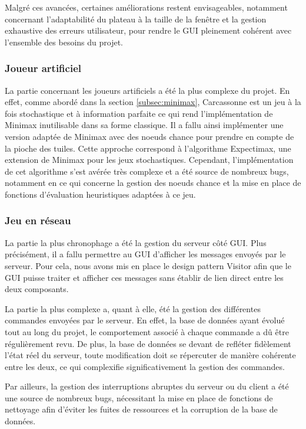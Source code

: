 \documentclass[11pt]{article}
\begin{document}
Malgré ces avancées, certaines améliorations restent envisageables, 
notamment concernant l'adaptabilité du plateau à la taille de la fenêtre 
et la gestion exhaustive des erreurs utilisateur, pour rendre le GUI 
pleinement cohérent avec l'ensemble des besoins du projet.

\subsubsection{Joueur artificiel}

La partie concernant les joueurs artificiels a été la plus complexe du projet. En effet, comme abordé dans la section \ref{subsec:minimax}, Carcassonne est un jeu à la fois stochastique et à information parfaite
ce qui rend l'implémentation de Minimax inutilisable dans sa forme classique.
Il a fallu ainsi implémenter une version adaptée de Minimax avec des noeuds chance pour prendre en compte de la pioche des tuiles. 
Cette approche correspond à l'algorithme Expectimax, une extension de Minimax pour les jeux stochastiques.
Cependant, l'implémentation de cet algorithme s'est avérée très complexe et a été source de nombreux bugs, notamment en ce qui concerne la gestion des noeuds chance et la mise en place de fonctions d'évaluation heuristiques adaptées à ce jeu.


\subsubsection{Jeu en réseau}


La partie la plus chronophage a été la gestion du serveur côté GUI. 
Plus précisément, il a fallu permettre au GUI d'afficher les messages 
envoyés par le serveur. Pour cela, nous avons mis en place le design 
pattern Visitor afin que le GUI puisse traiter et afficher ces messages 
sans établir de lien direct entre les deux composants.

La partie la plus complexe a, quant à elle, été la gestion des différentes 
commandes envoyées par le serveur. En effet, la base de données ayant 
évolué tout au long du projet, le comportement associé à chaque commande 
a dû être régulièrement revu. De plus, la base de données se devant de 
refléter fidèlement l'état réel du serveur, toute modification doit se 
répercuter de manière cohérente entre les deux, ce qui complexifie 
significativement la gestion des commandes.

Par ailleurs, la gestion des interruptions abruptes du serveur ou du 
client a été une source de nombreux bugs, nécessitant la mise en place 
de fonctions de nettoyage afin d'éviter les fuites de ressources et la 
corruption de la base de données.
\end{document}

